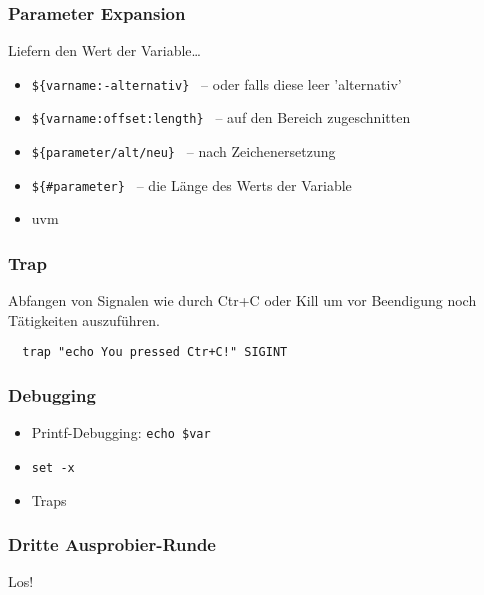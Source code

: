 \documentclass{beamer}
\begin{document}
\begin{frame}
 \frametitle{Parameter Expansion}
 
 Liefern den Wert der Variable…
 \begin{itemize}
  \item {\tt \$\{varname:-alternativ\} } -- oder falls diese leer 'alternativ'
  \item {\tt \$\{varname:offset:length\} } -- auf den Bereich zugeschnitten
  \item {\tt \$\{parameter/alt/neu\} } -- nach Zeichenersetzung
  \item {\tt \$\{\#parameter\} } -- die Länge des Werts der Variable
  \item uvm
 \end{itemize}
\end{frame}

\begin{frame}[fragile]
 \frametitle{Trap}
 Abfangen von Signalen wie durch Ctr+C oder Kill um vor Beendigung noch Tätigkeiten auszuführen.
 \bigskip
 
 \begin{lstlisting}
  trap "echo You pressed Ctr+C!" SIGINT 
 \end{lstlisting}
\end{frame}

\begin{frame}
 \frametitle{Debugging}
 \begin{itemize}
  \item Printf-Debugging: {\tt echo \$var }
  \item {\tt set -x }
  \item Traps
 \end{itemize}
\end{frame}

\begin{frame}
 \frametitle{Dritte Ausprobier-Runde}
 \begin{center}
 Los!
 \end{center}
\end{frame}
\end{document}
